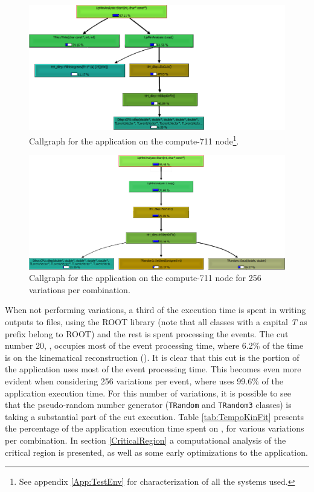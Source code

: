 \begin{figure}[!htp]
	\begin{center}
		\includegraphics[scale=0.5]{../../common/img/callgraph_start_1.png}
		\caption{Callgraph for the \tth application on the compute-711 node\footnote{See appendix \ref{App:TestEnv} for characterization of all the systems used.}.}
		\label{fig:Callgraph1}
	\end{center}
\end{figure}

\begin{figure}[!htp]
	\begin{center}
		\includegraphics[scale=0.5]{../../common/img/callgraph_start_256.png}
		\caption{Callgraph for the \tth application on the compute-711 node for 256 variations per combination.}
		\label{fig:Callgraph256}
	\end{center}
\end{figure}

When not performing variations, a third of the execution time is spent in writing outputs to files, using the ROOT library (note that all classes with a capital \textit{T} as prefix belong to ROOT) and the rest is spent processing the events. The cut number 20, \ttDilepKinFit, occupies most of the event processing time, where 6.2\% of the time is on the kinematical reconstruction (\dilep). It is clear that this cut is the portion of the application uses most of the event processing time. This becomes even more evident when considering 256 variations per event, where \ttDilepKinFit uses 99.6\% of the application execution time. For this number of variations, it is possible to see that the pseudo-random number generator (\texttt{TRandom} and \texttt{TRandom3} classes) is taking a substantial part of the cut execution. Table \ref{tab:TempoKinFit} presents the percentage of the application execution time spent on \ttDilepKinFit, for various variations per combination. In section \ref{CriticalRegion} a computational analysis of the critical region is presented, as well as some early optimizations to the application.


